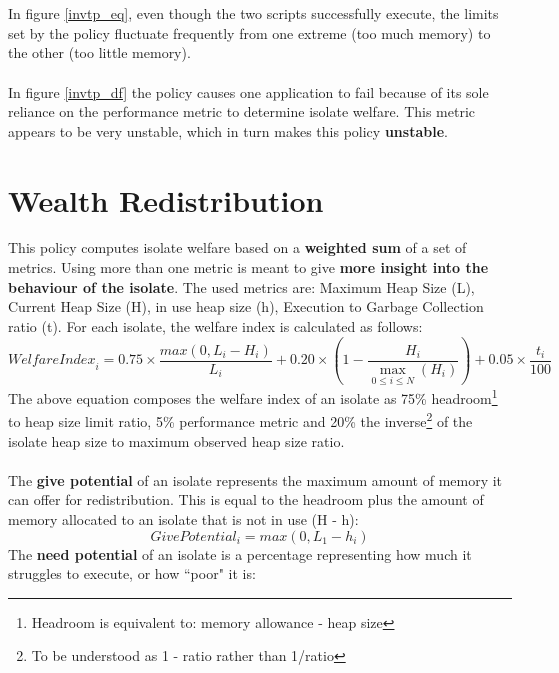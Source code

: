 \documentclass{l4proj}
\begin{document}
\\\\
\hspace*{1em} In figure \ref{invtp_eq}, even though the two scripts successfully execute, the limits set by the policy fluctuate frequently from one extreme (too much memory) to the other (too little memory).
\\\\
\hspace*{1em} In figure \ref{invtp_df} the policy causes one application to fail because of its sole reliance on the performance metric to determine isolate welfare. This metric appears to be very unstable, which in turn makes this policy \textbf{unstable}.

\section{Wealth Redistribution}
\hspace*{1em} This policy computes isolate welfare based on a \textbf{weighted sum} of a set of metrics. Using more than one metric is meant to give \textbf{more insight into the behaviour of the isolate}. The used metrics are:
Maximum Heap Size (L), Current Heap Size (H), in use heap size (h), Execution to Garbage Collection ratio (t). For each isolate, the welfare index is calculated as follows:
\begin{equation}
\textit{WelfareIndex}_i = 0.75\times \dfrac{max\left(0,L_i - H_i\right)}{L_i}+0.20\times \left(1 - \dfrac{H_i}{\max_{0 \leq i \leq N}(H_i)}\right)+0.05\times \dfrac{t_i}{100}
\end{equation}
The above equation composes the welfare index of an isolate as 75\% headroom\footnote{Headroom is equivalent to: memory allowance - heap size } to heap size limit ratio, 5\% performance metric and 20\% the inverse\footnote{To be understood as 1 - ratio rather than 1/ratio} of the isolate heap size to maximum observed heap size ratio. 
\\\\
The \textbf{give potential} of an isolate represents the maximum amount of memory it can offer for redistribution. This is equal to the headroom plus the amount of memory allocated to an isolate that is not in use (H - h):
\begin{equation}
\textit{GivePotential}_i = max(0,L_1 - h_i)
\end{equation}
The \textbf{need potential} of an isolate is a percentage representing how much it struggles to execute, or how ``poor" it is:
\end{document}
